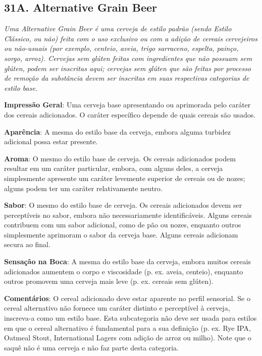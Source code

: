 \subsection*{31A. Alternative Grain Beer}
\textit{Uma Alternative Grain Beer é uma cerveja de estilo padrão (sendo Estilo Clássico, ou não) feita com o uso exclusivo ou com a adição de cereais cervejeiros ou não-usuais (por exemplo, centeio, aveia, trigo sarraceno, espelta, painço, sorgo, arroz). Cervejas sem glúten feitas com ingredientes que não possuam sem glúten, podem ser inscritas aqui; cervejas sem glúten que são feitas por processo de remoção da substância devem ser inscritas em suas respectivas categorias de estilo base.}

\textbf{Impressão Geral}: Uma cerveja base apresentando ou aprimorada pelo caráter dos cereais adicionados. O caráter específico depende de quais cereais são usados.

\textbf{Aparência}: A mesma do estilo base da cerveja, embora alguma turbidez adicional possa estar presente.

\textbf{Aroma}: O mesmo do estilo base de cerveja. Os cereais adicionados podem resultar em um caráter particular, embora, com alguns deles, a cerveja simplesmente apresente um caráter levemente superior de cereais ou de nozes; alguns podem ter um caráter relativamente neutro.

\textbf{Sabor}: O mesmo do estilo base de cerveja. Os cereais adicionados devem ser perceptíveis no sabor, embora não necessariamente identificáveis. Alguns cereais contribuem com um sabor adicional, como de pão ou nozes, enquanto outros simplesmente aprimoram o sabor da cerveja base. Alguns cereais adicionam secura ao final.

\textbf{Sensação na Boca}: A mesma do estilo base da cerveja, embora muitos cereais adicionados aumentem o corpo e viscosidade (p. ex. aveia, centeio), enquanto outros promovem uma cerveja mais leve (p. ex. cereais sem glúten).

\textbf{Comentários}: O cereal adicionado deve estar aparente no perfil sensorial. Se o cereal alternativo não fornece um caráter distinto e perceptível à cerveja, inscreva-a como um estilo base. Esta subcategoria não deve ser usada para estilos em que o cereal alternativo é fundamental para a sua definição (p. ex. Rye IPA, Oatmeal Stout, International Lagers com adição de arroz ou milho). Note que o saquê não é uma cerveja e não faz parte desta categoria.

